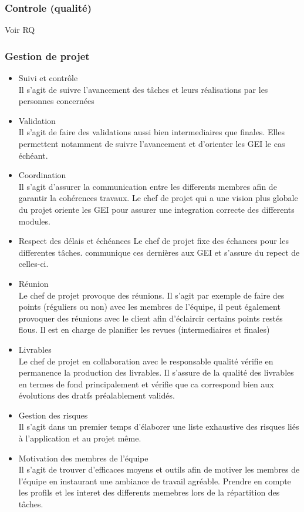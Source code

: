\subsubsection{Controle (qualité)}
Voir RQ
\subsubsection{Gestion de projet}
\begin{itemize}
\item {Suivi et contrôle\\}
Il s'agit de suivre l'avancement des tâches et leurs réalisations par les personnes concernées\\
\item {Validation\\}
Il s'agit de faire des validations aussi bien intermediaires que finales. Elles permettent notamment de suivre l'avancement et d'orienter les GEI le cas échéant.
\item {Coordination\\}
Il s'agit d'assurer la communication entre les differents membres afin de garantir la cohérences travaux. Le chef de projet qui a une vision plus globale du projet oriente les GEI 
pour assurer une integration correcte des differents modules.\\
\item {Respect des délais et échéances}
Le chef de projet fixe des échances pour les differentes tâches. communique ces dernières aux GEI et s'assure du repect de celles-ci. \\
\item {Réunion\\}
Le chef de projet provoque des réunions. Il s'agit par exemple de faire des points (réguliers ou non) avec les membres de l'équipe, il peut également
provoquer des réunions avec le client afin d'éclaircir certains points restés flous. Il est en charge de planifier les revues (intermediaires et finales)\\
\item {Livrables\\} 
Le chef de projet en collaboration avec le responsable qualité vérifie en permanence la production des livrables. Il s'assure de la qualité des livrables en termes de fond principalement 
et vérifie que ca correspond bien aux évolutions des dratfs préalablement validés.\\
\item {Gestion des risques\\}
Il s'agit dans un premier temps d'élaborer une liste exhaustive des risques liés à l'application et au projet même.\\
\item {Motivation des membres de l'équipe\\}
Il s'agit de trouver d'efficaces moyens et outils afin de motiver les membres de l'équipe en instaurant une ambiance de travail agréable.
Prendre en compte les profils et les interet des differents memebres lors de la répartition des tâches.\\
\end{itemize}
